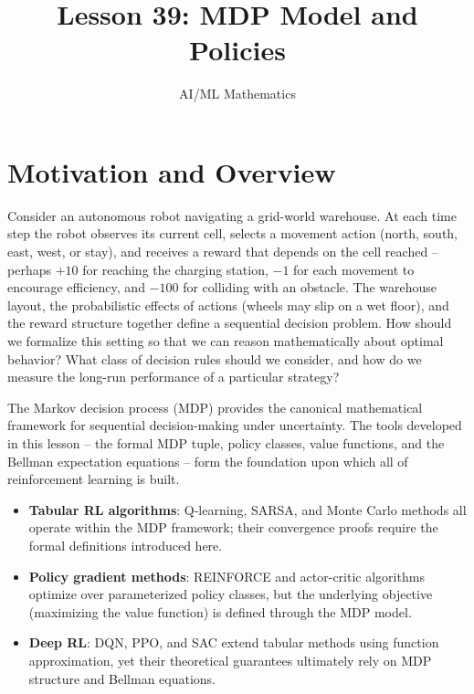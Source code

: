 \documentclass[11pt,a4paper]{article}
\title{Lesson 39: MDP Model and Policies}
\author{AI/ML Mathematics}
\date{}
\begin{document}
\maketitle
\tableofcontents
\newpage


\section{Motivation and Overview}
\label{sec:motivation}

Consider an autonomous robot navigating a grid-world warehouse. At each
time step the robot observes its current cell, selects a movement action
(north, south, east, west, or stay), and receives a reward that depends
on the cell reached -- perhaps $+10$ for reaching the charging station,
$-1$ for each movement to encourage efficiency, and $-100$ for
colliding with an obstacle. The warehouse layout, the probabilistic
effects of actions (wheels may slip on a wet floor), and the reward
structure together define a sequential decision problem. How should we
formalize this setting so that we can reason mathematically about
optimal behavior? What class of decision rules should we consider, and
how do we measure the long-run performance of a particular strategy?

The Markov decision process (MDP) provides the canonical mathematical
framework for sequential decision-making under uncertainty. The tools
developed in this lesson -- the formal MDP tuple, policy classes, value
functions, and the Bellman expectation equations -- form the foundation
upon which all of reinforcement learning is built.

\begin{rlconnection}[title={Why MDPs Matter for RL/ML}]
\begin{itemize}[nosep]
    \item \textbf{Tabular RL algorithms}: Q-learning, SARSA, and Monte
    Carlo methods all operate within the MDP framework; their
    convergence proofs require the formal definitions introduced here.
    \item \textbf{Policy gradient methods}: REINFORCE and actor-critic
    algorithms optimize over parameterized policy classes, but the
    underlying objective (maximizing the value function) is defined
    through the MDP model.
    \item \textbf{Deep RL}: DQN, PPO, and SAC extend tabular methods
    using function approximation, yet their theoretical guarantees
    ultimately rely on MDP structure and Bellman equations.
\end{itemize}
\end{rlconnection}
\end{document}
